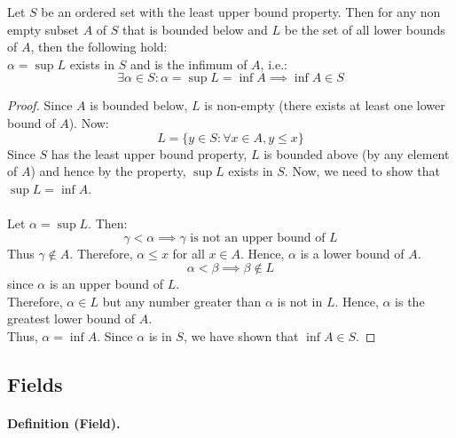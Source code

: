 \documentclass[openany]{book}
\numberwithin{equation}{section}
\begin{document}
    Let $S$ be an ordered set with the least upper bound property. Then for any non empty subset $A$ of $S$ that is bounded below and $L$ be the set of all lower bounds of $A$, then the following hold: \\ 
    $\alpha = \sup L$ exists in $S$ and is the infimum of $A$, i.e.: 
    $$\exists \alpha \in S: \alpha = \sup L = \inf A \implies \inf A \in S$$
\par
\begin{proof}
    Since $A$ is bounded below, $L$ is non-empty (there exists at least one lower bound of $A$). Now: 
    $$L = \{y\in S: \forall x \in A, y \leq x\}$$
    Since $S$ has the least upper bound property, $L$ is bounded above (by any element of $A$) and hence by the property, $\sup L$ exists in $S$. Now, we need to show that $\sup L = \inf A$. \\ \\ 
    Let $\alpha = \sup L$. Then: 
    $$\gamma < \alpha \implies \gamma \text{ is not an upper bound of } L$$
    Thus $\gamma \notin A$. Therefore, $\alpha \leq x$ for all $x \in A$. Hence, $\alpha$ is a lower bound of $A$. \\
    $$\alpha < \beta \implies \beta \notin L$$ since $\alpha$ is an upper bound of $L$. \\
    Therefore, $\alpha \in L$ but any number greater than $\alpha$ is not in $L$. Hence, $\alpha$ is the greatest lower bound of $A$. \\
    Thus, $\alpha = \inf A$. Since $\alpha$ is in $S$, we have shown that $\inf A \in S$.
\end{proof}
\subsection{Fields}
\paragraph{Definition (Field).}
\end{document}
